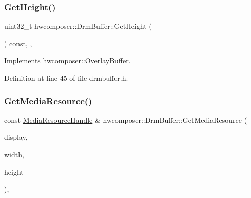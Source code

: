 \subsubsection{\texorpdfstring{Get\+Height()}{GetHeight()}}
{\footnotesize\ttfamily uint32\+\_\+t hwcomposer\+::\+Drm\+Buffer\+::\+Get\+Height (\begin{DoxyParamCaption}{ }\end{DoxyParamCaption}) const\hspace{0.3cm}{\ttfamily [inline]}, {\ttfamily [override]}, {\ttfamily [virtual]}}



Implements \mbox{\hyperlink{classhwcomposer_1_1OverlayBuffer_a30b6043a9da6a8116d0471d66f836878}{hwcomposer\+::\+Overlay\+Buffer}}.



Definition at line 45 of file drmbuffer.\+h.


\begin{DoxyCode}{0}
\end{DoxyCode}
\mbox{\label{classhwcomposer_1_1DrmBuffer_a816ad1d2e1f7698eba57d58096b532dc}} 
\subsubsection{\texorpdfstring{Get\+Media\+Resource()}{GetMediaResource()}}
{\footnotesize\ttfamily const \mbox{\hyperlink{namespacehwcomposer_aa99e35835961ac7d6baa59a04131ff42}{Media\+Resource\+Handle}} \& hwcomposer\+::\+Drm\+Buffer\+::\+Get\+Media\+Resource (\begin{DoxyParamCaption}\item[{\mbox{\hyperlink{namespacehwcomposer_a10d64930907cc775f9cea6b39d8cb404}{Media\+Display}}}]{display,  }\item[{uint32\+\_\+t}]{width,  }\item[{uint32\+\_\+t}]{height }\end{DoxyParamCaption})\hspace{0.3cm}{\ttfamily [override]}, {\ttfamily [virtual]}}



